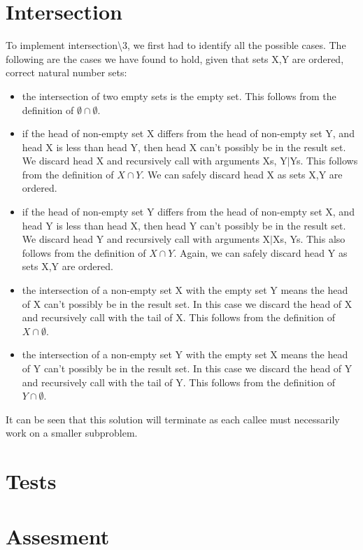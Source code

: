\documentclass[]{article}
\begin{document}
\section{Intersection} %
\label{sec:intersection}

To implement intersection\textbackslash3, we first had to identify all the possible cases. The following are the cases we have found to hold, given that sets X,Y are ordered, correct natural number sets:

\begin{itemize}
	\item the intersection of two empty sets is the empty set. This follows from the definition of $\emptyset \cap \emptyset$.
	\item if the head of non-empty set X differs from the head of non-empty set Y, and head X is less than head Y, then head X can't possibly be in the result set. We discard head X and recursively call with arguments Xs, Y$|$Ys. This follows from the definition of $X \cap Y$. We can safely discard head X as sets X,Y are ordered.
	\item if the head of non-empty set Y differs from the head of non-empty set X, and head Y is less than head X, then head Y can't possibly be in the result set. We discard head Y and recursively call with arguments X$|$Xs, Ys. This also follows from the definition of $X \cap Y$. Again, we can safely discard head Y as sets X,Y are ordered.
	\item the intersection of a non-empty set X with the empty set Y means the head of X can't possibly be in the result set. In this case we discard the head of X and recursively call with the tail of X. This follows from the definition of $X \cap \emptyset$.
	\item the intersection of a non-empty set Y with the empty set X means the head of Y can't possibly be in the result set. In this case we discard the head of Y and recursively call with the tail of Y. This follows from the definition of $Y \cap \emptyset$.

\end{itemize}

It can be seen that this solution will terminate as each callee must necessarily work on a smaller subproblem.\par

\section{Tests} %
\label{sec:tests}

\section{Assesment} %
\label{sec:assesment}



\end{document}
